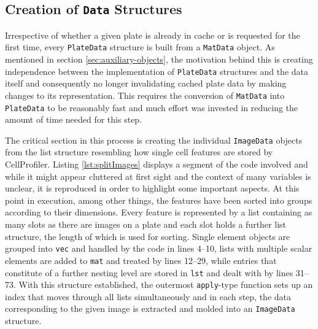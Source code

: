 \subsection{Creation of \texttt{Data} Structures}
Irrespective of whether a given plate is already in cache or is requested for the first time, every \texttt{PlateData} structure is built from a \texttt{MatData} object. As mentioned in section \ref{sec:auxiliary-objects}, the motivation behind this is creating independence between the implementation of \texttt{PlateData} structures and the data itself and consequently no longer invalidating cached plate data by making changes to its representation. This requires the conversion of \texttt{MatData} into \texttt{PlateData} to be reasonably fast and much effort was invested in reducing the amount of time needed for this step.

The critical section in this process is creating the individual \texttt{ImageData} objects from the list structure resembling how single cell features are stored by CellProfiler. Listing \ref{lst:splitImages} displays a segment of the code involved and while it might appear cluttered at first sight and the context of many variables is unclear, it is reproduced in order to highlight some important aspects. At this point in execution, among other things, the features have been sorted into groups according to their dimensions. Every feature is represented by a list containing as many slots as there are images on a plate and each slot holds a further list structure, the length of which is used for sorting. Single element objects are grouped into \texttt{vec} and handled by the code in lines 4--10, lists with multiple scalar elements are added to \texttt{mat} and treated by lines 12--29, while entries that constitute of a further nesting level are stored in \texttt{lst} and dealt with by lines 31--73. With this structure established, the outermost \texttt{apply}-type function sets up an index that moves through all lists simultaneously and in each step, the data corresponding to the given image is extracted and molded into an \texttt{ImageData} structure.

